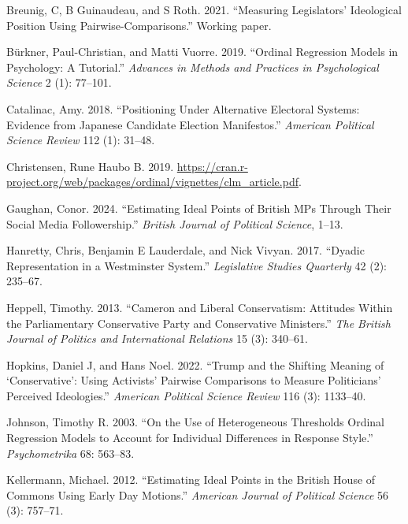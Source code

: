 \documentclass[
]{article}
\newlength{\cslhangindent}
\newenvironment{CSLReferences}[2] %
 {\begin{list}{}{%
  \setlength{\itemindent}{0pt}
  \setlength{\leftmargin}{0pt}
  \setlength{\parsep}{0pt}
  \ifodd #1
   \setlength{\leftmargin}{\cslhangindent}
   \setlength{\itemindent}{-1\cslhangindent}
  \fi
  \setlength{\itemsep}{#2\baselineskip}}}
 {\end{list}}
\begin{document}
\label{refs}
\begin{CSLReferences}{1}{0}
Breunig, C, B Guinaudeau, and S Roth. 2021. {``Measuring Legislators'
Ideological Position Using Pairwise-Comparisons.''} Working paper.

Bürkner, Paul-Christian, and Matti Vuorre. 2019. {``Ordinal Regression
Models in Psychology: A Tutorial.''} \emph{Advances in Methods and
Practices in Psychological Science} 2 (1): 77--101.

Catalinac, Amy. 2018. {``Positioning Under Alternative Electoral
Systems: Evidence from {J}apanese Candidate Election Manifestos.''}
\emph{American Political Science Review} 112 (1): 31--48.

Christensen, Rune Haubo B. 2019.
\url{https://cran.r-project.org/web/packages/ordinal/vignettes/clm_article.pdf}.

Gaughan, Conor. 2024. {``Estimating Ideal Points of British MPs Through
Their Social Media Followership.''} \emph{British Journal of Political
Science}, 1--13.

Hanretty, Chris, Benjamin E Lauderdale, and Nick Vivyan. 2017. {``Dyadic
Representation in a {W}estminster System.''} \emph{Legislative Studies
Quarterly} 42 (2): 235--67.

Heppell, Timothy. 2013. {``Cameron and Liberal Conservatism: Attitudes
Within the Parliamentary {C}onservative Party and {C}onservative
Ministers.''} \emph{The British Journal of Politics and International
Relations} 15 (3): 340--61.

Hopkins, Daniel J, and Hans Noel. 2022. {``Trump and the Shifting
Meaning of {`Conservative'}: Using Activists' Pairwise Comparisons to
Measure Politicians' Perceived Ideologies.''} \emph{American Political
Science Review} 116 (3): 1133--40.

Johnson, Timothy R. 2003. {``On the Use of Heterogeneous Thresholds
Ordinal Regression Models to Account for Individual Differences in
Response Style.''} \emph{Psychometrika} 68: 563--83.

Kellermann, Michael. 2012. {``Estimating Ideal Points in the {B}ritish
{H}ouse of {C}ommons Using Early Day Motions.''} \emph{American Journal
of Political Science} 56 (3): 757--71.


\end{CSLReferences}
\end{document}
